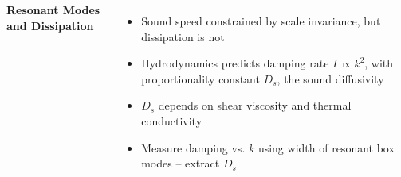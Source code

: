 \documentclass[26pt, paperwidth=36in,paperheight=48in]{tikzposter} %
\newcommand{\myfont}{\fontsize{24}{30}\selectfont}
\begin{document}
\begin{columns}
{\begin{minipage}{0.2\textwidth}
	\end{minipage}
	\hspace{0.25cm}
%		
%		
	
	\vspace{0cm}
	\begin{minipage}{0.2\textwidth}
		\flushleft
		\textbf{Resonant Modes and Dissipation}
		\vspace{0.5cm}
		\myfont
		\begin{minipage}{0.8\textwidth}
			\flushleft
			\vspace{1.2cm}
			\begin{itemize}
				\item Sound speed constrained by scale invariance, but dissipation is not
				
				\item Hydrodynamics predicts damping rate $\Gamma \propto k^2$, with proportionality constant $D_s$, the sound diffusivity
				
				\item $D_s$ depends on shear viscosity and thermal conductivity 
				
				\item Measure damping vs. $k$ using width of resonant box modes -- extract $D_s$
			\end{itemize}
		\end{minipage}
		

\end{minipage}}
\end{columns}
\end{document}
